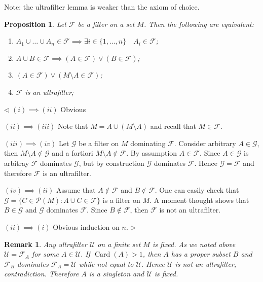 \documentclass[12pt]{article}
\newtheorem{proposition}[theorem]{Proposition}
\newtheorem{remark}[theorem]{Remark}
\newenvironment{proof}{\par $\triangleleft$}{$\triangleright$}
\begin{document}
Note: the ultrafilter lemma is weaker than the axiom of choice.

\begin{proposition}\label{PrUltraFilterCharac} Let $\mathcal{F}$ be a filter on
    a set $M$. Then the following are equivalent:
    \begin{enumerate}[label = (\roman*)]
        \item $A_1\cup\ldots\cup A_n\in\mathcal{F}\implies\exists i\in
                  \{1,\ldots,n\}\quad A_i\in\mathcal{F}$;
        \item $A\cup B\in\mathcal{F}\implies (A\in\mathcal{F})\vee
                  (B\in\mathcal{F})$;
        \item $(A\in\mathcal{F})\vee(M\setminus A\in\mathcal{F})$;
        \item $\mathcal{F}$ is an ultrafilter;
    \end{enumerate}
\end{proposition}
\begin{proof} $(i)\implies (ii)$ Obvious

    $(ii)\implies (iii)$ Note that $M=A\cup(M\setminus A)$ and recall that
    $M\in\mathcal{F}$.

    $(iii)\implies (iv)$ Let $\mathcal{G}$ be a filter on $M$ dominating
    $\mathcal{F}$. Consider arbitrary $A\in\mathcal{G}$, then $M\setminus
        A\notin\mathcal{G}$ and a fortiori $M\setminus A\notin\mathcal{F}$. By
    assumption $A\in\mathcal{F}$. Since $A\in\mathcal{G}$ is arbitray
    $\mathcal{F}$ dominates $\mathcal{G}$, but by construction $\mathcal{G}$
    dominates $\mathcal{F}$. Hence $\mathcal{G}=\mathcal{F}$ and therefore
    $\mathcal{F}$ is an ultrafilter.

    $(iv)\implies (ii)$ Assume that $A\notin\mathcal{F}$ and
    $B\notin\mathcal{F}$. One can easily check that
    $\mathcal{G}=\{C\in\mathcal{P}(M):A\cup C\in\mathcal{F}\}$ is a filter on
    $M$. A moment thought shows that $B\in\mathcal{G}$ and $\mathcal{G}$
    dominates $\mathcal{F}$. Since $B\notin \mathcal{F}$, then $\mathcal{F}$ is
    not an ultrafilter.

    $(ii)\implies (i)$ Obvious induction on $n$.
\end{proof}

\begin{remark}\label{RemDescOfUltrafiltersOnFiniteSets} Any ultrafilter
    $\mathcal{U}$ on a finite set $M$ is fixed. As we noted above
    $\mathcal{U}=\mathcal{F}_A$ for some $A\in\mathcal{U}$. If
    $\operatorname{Card}(A)>1$, then $A$ has a proper subset $B$ and
    $\mathcal{F}_B$ dominates $\mathcal{F}_A=\mathcal{U}$ while not equal to
    $\mathcal{U}$. Hence $\mathcal{U}$ is not an ultrafilter, contradiction.
    Therefore $A$ is a singleton and $\mathcal{U}$ is fixed.
\end{remark}
\end{document}

